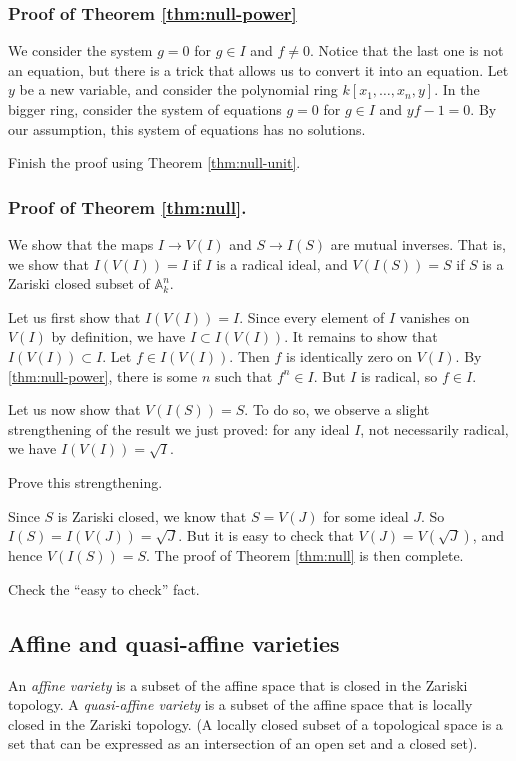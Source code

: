 \documentclass[11pt]{article}
\begin{document}
\subsubsection{Proof of Theorem \ref{thm:null-power}}
\label{sec:org0709364}
We consider the system \(g = 0\) for \(g \in I\) and \(f \neq 0\).
Notice that the last one is not an equation, but there is a trick that allows us to convert it into an equation.
Let \(y\) be a new variable, and consider the polynomial ring \(k[x_1,\dots,x_n,y]\).
In the bigger ring, consider the system of equations \(g = 0\) for \(g \in I\) and \(yf - 1 = 0\).
By our assumption, this system of equations has no solutions.
\begin{skipped}
Finish the proof using Theorem \ref{thm:null-unit}.
\end{skipped}

\subsubsection{Proof of Theorem \ref{thm:null}.}
\label{sec:orgbe91776}
We show that the maps \(I \to V(I)\) and \(S \to I(S)\) are mutual inverses.
That is, we show that \(I(V(I)) = I\) if \(I\) is a radical ideal, and \(V(I(S)) = S\) if \(S\) is a Zariski closed subset of \(\mathbb A^n_k\).

Let us first show that \(I(V(I)) = I\).
Since every element of \(I\) vanishes on \(V(I)\) by definition, we have \(I \subset I(V(I))\).
It remains to show that \(I(V(I)) \subset I\).
Let \(f \in I(V(I))\).
Then \(f\) is identically zero on \(V(I)\).
By \ref{thm:null-power}, there is some \(n\) such that \(f^n \in I\).
But \(I\) is radical, so \(f \in I\).

Let us now show that \(V(I(S)) = S\).
To do so, we observe a slight strengthening of the result we just proved: for any ideal \(I\), not necessarily radical, we have \(I(V(I)) = \sqrt{I}\). 
\begin{skipped}
Prove this strengthening.
\end{skipped}
Since \(S\) is Zariski closed, we know that \(S = V(J)\) for some ideal \(J\).
So \(I(S) = I(V(J)) = \sqrt{J}.\)
But it is easy to check that \(V(J) = V(\sqrt{J})\), and hence \(V(I(S)) = S\).
The proof of Theorem \ref{thm:null} is then complete.
\begin{skipped}
Check the ``easy to check'' fact.
\end{skipped}

\subsection{Affine and quasi-affine varieties}
\label{sec:org864e7ae}
An \emph{affine variety} is a subset of the affine space that is closed in the Zariski topology.
A \emph{quasi-affine variety} is a subset of the affine space that is locally closed in the Zariski topology.
(A locally closed subset of a topological space is a set that can be expressed as an intersection of an open set and a closed set).
\end{document}
